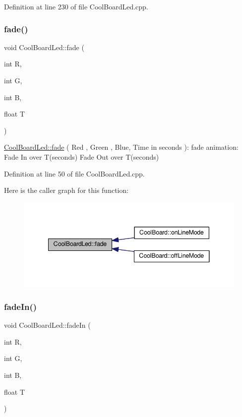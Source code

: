 Definition at line 230 of file Cool\+Board\+Led.\+cpp.

\mbox{\label{class_cool_board_led_af1cacbaa88db8bcf6042c1083ba41155}} 
\subsubsection{\texorpdfstring{fade()}{fade()}}
{\footnotesize\ttfamily void Cool\+Board\+Led\+::fade (\begin{DoxyParamCaption}\item[{int}]{R,  }\item[{int}]{G,  }\item[{int}]{B,  }\item[{float}]{T }\end{DoxyParamCaption})}

\hyperlink{class_cool_board_led_af1cacbaa88db8bcf6042c1083ba41155}{Cool\+Board\+Led\+::fade} ( Red , Green , Blue, Time in seconds )\+: fade animation\+: Fade In over T(seconds) Fade Out over T(seconds) 

Definition at line 50 of file Cool\+Board\+Led.\+cpp.

Here is the caller graph for this function\+:\nopagebreak
\begin{figure}[H]
\begin{center}
\leavevmode
\includegraphics[width=341pt]{class_cool_board_led_af1cacbaa88db8bcf6042c1083ba41155_icgraph}
\end{center}
\end{figure}
\mbox{\label{class_cool_board_led_ab778f5e7bed0ab74e3906d82110493c3}} 
\subsubsection{\texorpdfstring{fade\+In()}{fadeIn()}}
{\footnotesize\ttfamily void Cool\+Board\+Led\+::fade\+In (\begin{DoxyParamCaption}\item[{int}]{R,  }\item[{int}]{G,  }\item[{int}]{B,  }\item[{float}]{T }\end{DoxyParamCaption})}

